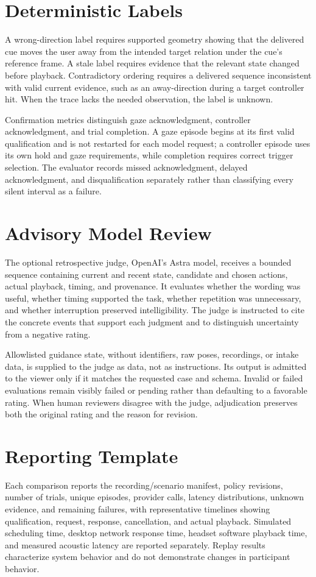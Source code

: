 \section{Deterministic Labels}
A wrong-direction label requires supported geometry showing that the delivered cue moves the user away from the intended target relation under the cue's reference frame. A stale label requires evidence that the relevant state changed before playback. Contradictory ordering requires a delivered sequence inconsistent with valid current evidence, such as an away-direction during a target controller hit. When the trace lacks the needed observation, the label is unknown.

Confirmation metrics distinguish gaze acknowledgment, controller acknowledgment, and trial completion. A gaze episode begins at its first valid qualification and is not restarted for each model request; a controller episode uses its own hold and gaze requirements, while completion requires correct trigger selection. The evaluator records missed acknowledgment, delayed acknowledgment, and disqualification separately rather than classifying every silent interval as a failure.

\section{Advisory Model Review}
The optional retrospective judge, OpenAI's Astra model, receives a bounded sequence containing current and recent state, candidate and chosen actions, actual playback, timing, and provenance. It evaluates whether the wording was useful, whether timing supported the task, whether repetition was unnecessary, and whether interruption preserved intelligibility. The judge is instructed to cite the concrete events that support each judgment and to distinguish uncertainty from a negative rating.

Allowlisted guidance state, without identifiers, raw poses, recordings, or intake data, is supplied to the judge as data, not as instructions. Its output is admitted to the viewer only if it matches the requested case and schema. Invalid or failed evaluations remain visibly failed or pending rather than defaulting to a favorable rating. When human reviewers disagree with the judge, adjudication preserves both the original rating and the reason for revision.

\section{Reporting Template}
Each comparison reports the recording/scenario manifest, policy revisions, number of trials, unique episodes, provider calls, latency distributions, unknown evidence, and remaining failures, with representative timelines showing qualification, request, response, cancellation, and actual playback. Simulated scheduling time, desktop network response time, headset software playback time, and measured acoustic latency are reported separately. Replay results characterize system behavior and do not demonstrate changes in participant behavior.
